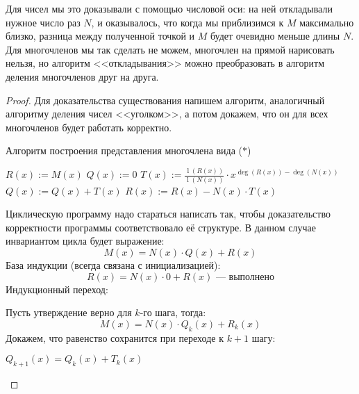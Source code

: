 \documentclass[russian]{lecture-notes}
\theoremstyle{definition}
\DeclareMathOperator{\Deg}{deg}
\newcommand{\D}[1]{\Deg(#1)}
\DeclareMathOperator{\Lid}{l}
\newcommand{\lid}[1]{\Lid(#1)}
\begin{document}
    \begin{note}
        Для чисел мы это доказывали с помощью числовой оси: на ней откладывали нужное число раз $N$, и оказывалось, что когда мы приблизимся к $M$ максимально близко, разница между полученной точкой и $M$ будет очевидно меньше длины $N$. Для многочленов мы так сделать не можем, многочлен на прямой нарисовать нельзя, но алгоритм <<откладывания>> можно преобразовать в алгоритм деления многочленов друг на друга.
    \end{note}

    \begin{proof}
        Для доказательства существования напишем алгоритм, аналогичный алгоритму деления чисел <<уголком>>, а потом докажем, что он для всех многочленов будет работать корректно.
        \begin{algorithm}[H]
            \caption{Алгоритм построения представления многочлена вида ($\ast$)}\label{alg:mnogoch}
            \begin{algorithmic}[1]
                \State $R(x) := M(x)$
                \State $Q(x) := 0$
                \Statex
                \While{$\D{R(x)} \geqslant \D{N(x)}$}
                    \State $\displaystyle T(x) := \frac{\lid{R(x)}}{\lid{N(x)}} \cdot x^{\D{R(x)} - \D{N(x)}}$
                    \State $Q(x) := Q(x) + T(x)$
                    \State $R(x) := R(x) - N(x) \cdot T(x)$
                \EndWhile
                \Statex
            \end{algorithmic}
        \end{algorithm}

        \begin{note}
            Циклическую программу надо стараться написать так, чтобы доказательство корректности программы соответствовало её структуре. В данном случае инвариантом цикла будет выражение:
            \[
                M(x) = N(x) \cdot Q(x) + R(x)
            \]
            База индукции (всегда связана с инициализацией):
            \[
                R(x) = N(x) \cdot 0 + R(x) \text{~--- выполнено}
            \]
            Индукционный переход:

            \noindent Пусть утверждение верно для $k$-го шага, тогда:
            \[
                M(x) = N(x) \cdot Q_k(x) + R_k(x)
            \]
            Докажем, что равенство сохранится при переходе к $k+1$ шагу:

            $Q_{k+1}(x) = Q_k(x) + T_k(x)$


\end{note}
\end{proof}
\end{document}
